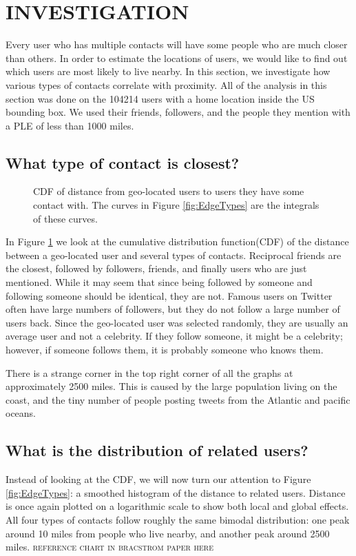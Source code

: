 \documentclass{sig-alternate}
\begin{document}
\section{INVESTIGATION}
Every user who has multiple contacts will have some people who are much
closer than others. In order to estimate the locations of users, we would like
to find out which users are most likely to live nearby.  In this section, we
investigate how various types of contacts correlate with proximity.
All of the analysis in this section was done on the 104214 users with a home location inside the US bounding box. We used their friends, followers, and the people they mention with a PLE of less than 1000 miles.

\subsection{What type of contact is closest?}
\begin{figure}
\centering
{}
\caption{
CDF of distance from geo-located users to users they have some contact
with.
The curves in Figure \ref{fig:EdgeTypes} are the integrals of these curves.
}
\label{fig:EdgeTypesCum}
\end{figure}
In Figure \ref{fig:EdgeTypesCum} we look at the cumulative distribution function(CDF) of the distance between a geo-located user and several types of contacts.
Reciprocal friends are the closest, followed by followers, friends, and finally users who are just mentioned.
While it may seem that since being followed by someone and following someone should be identical, they are not.
Famous users on Twitter often have large numbers of followers, but they do not follow a large number of users back.
Since the geo-located user was selected randomly, they are usually an average user and not a celebrity.
If they follow someone, it might be a celebrity; however, if someone follows them, it is probably someone who knows them.

There is a strange corner in the top right corner of all the graphs at approximately 2500 miles. This is caused by the large population living on the coast, and the tiny number of people posting tweets from the Atlantic and pacific oceans.

\subsection{What is the distribution of related users?}
Instead of looking at the CDF, we will now turn our attention to Figure
\ref{fig:EdgeTypes}: a smoothed histogram of the distance to related users.
Distance is once again plotted on a logarithmic scale to show both local and
global effects.
All four types of contacts follow roughly the same bimodal distribution:
one peak around 10 miles from people who live nearby, and another peak around
2500 miles.
\textsc{reference chart in bracstrom paper here}
\end{document}
